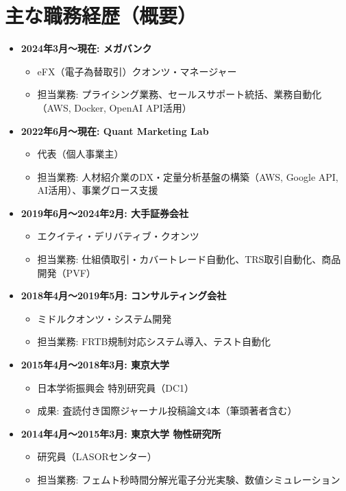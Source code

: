 \documentclass[uplatex,a4j,10.5pt,dvipdfmx]{jsarticle}
\begin{document}
\section{主な職務経歴（概要）}
\begin{itemize}[leftmargin=*]
	\item \textbf{2024年3月～現在: メガバンク}
	      \begin{itemize}
		      \item eFX（電子為替取引）クオンツ・マネージャー
		      \item 担当業務: プライシング業務、セールスサポート統括、業務自動化（AWS, Docker, OpenAI API活用）
	      \end{itemize}
	\item \textbf{2022年6月～現在: Quant Marketing Lab}
	      \begin{itemize}
		      \item 代表（個人事業主）
		      \item 担当業務: 人材紹介業のDX・定量分析基盤の構築（AWS, Google API, AI活用）、事業グロース支援
	      \end{itemize}
	\item \textbf{2019年6月～2024年2月: 大手証券会社}
	      \begin{itemize}
		      \item エクイティ・デリバティブ・クオンツ
		      \item 担当業務: 仕組債取引・カバートレード自動化、TRS取引自動化、商品開発（PVF）
	      \end{itemize}
	\item \textbf{2018年4月～2019年5月: コンサルティング会社}
	      \begin{itemize}
		      \item ミドルクオンツ・システム開発
		      \item 担当業務: FRTB規制対応システム導入、テスト自動化
	      \end{itemize}
	\item \textbf{2015年4月～2018年3月: 東京大学}
	      \begin{itemize}
		      \item 日本学術振興会 特別研究員（DC1）
		      \item 成果: 査読付き国際ジャーナル投稿論文4本（筆頭著者含む）
	      \end{itemize}
	\item \textbf{2014年4月～2015年3月: 東京大学 物性研究所}
	      \begin{itemize}
		      \item 研究員（LASORセンター）
		      \item 担当業務: フェムト秒時間分解光電子分光実験、数値シミュレーション
	      \end{itemize}
\end{itemize}
\end{document}
